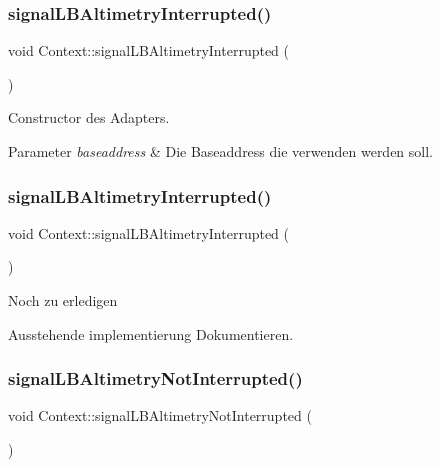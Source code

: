 \subsubsection{\texorpdfstring{signal\+L\+B\+Altimetry\+Interrupted()}{signalLBAltimetryInterrupted()}\hspace{0.1cm}{\footnotesize\ttfamily [1/2]}}
{\footnotesize\ttfamily void Context\+::signal\+L\+B\+Altimetry\+Interrupted (\begin{DoxyParamCaption}{ }\end{DoxyParamCaption})}

Constructor des Adapters.


\begin{DoxyParams}{Parameter}
{\em baseaddress} & Die Baseaddress die verwenden werden soll. \\
\hline
\end{DoxyParams}
\hypertarget{class_context_af78ea1902addcf137e8e7d99431592c6}{}\label{class_context_af78ea1902addcf137e8e7d99431592c6} 
\subsubsection{\texorpdfstring{signal\+L\+B\+Altimetry\+Interrupted()}{signalLBAltimetryInterrupted()}\hspace{0.1cm}{\footnotesize\ttfamily [2/2]}}
{\footnotesize\ttfamily void Context\+::signal\+L\+B\+Altimetry\+Interrupted (\begin{DoxyParamCaption}{ }\end{DoxyParamCaption})}

\begin{DoxyRefDesc}{Noch zu erledigen}
\item[\hyperlink{todo__todo000003}{Noch zu erledigen}]Ausstehende implementierung Dokumentieren. \end{DoxyRefDesc}
\hypertarget{class_context_acf97db4d70e7246a1d06e4166ece5de5}{}\label{class_context_acf97db4d70e7246a1d06e4166ece5de5} 
\subsubsection{\texorpdfstring{signal\+L\+B\+Altimetry\+Not\+Interrupted()}{signalLBAltimetryNotInterrupted()}\hspace{0.1cm}{\footnotesize\ttfamily [1/2]}}
{\footnotesize\ttfamily void Context\+::signal\+L\+B\+Altimetry\+Not\+Interrupted (\begin{DoxyParamCaption}{ }\end{DoxyParamCaption})}

